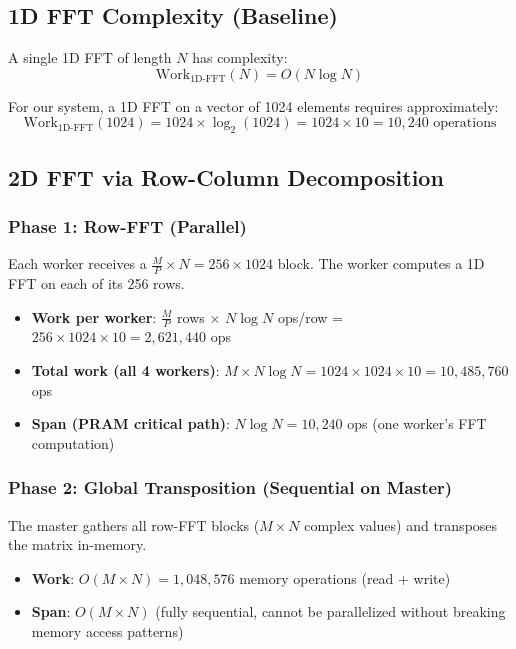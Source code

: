 \documentclass[11pt,a4paper]{article}
\begin{document}
\subsection{1D FFT Complexity (Baseline)}

A single 1D FFT of length $N$ has complexity:
\[
\text{Work}_{\text{1D-FFT}}(N) = O(N \log N)
\]

For our system, a 1D FFT on a vector of 1024 elements requires approximately:
\[
\text{Work}_{\text{1D-FFT}}(1024) = 1024 \times \log_2(1024) = 1024 \times 10 = 10{,}240 \text{ operations}
\]

\subsection{2D FFT via Row-Column Decomposition}

\subsubsection{Phase 1: Row-FFT (Parallel)}

Each worker receives a $\frac{M}{P} \times N = 256 \times 1024$ block. The worker computes a 1D FFT on each of its 256 rows.

\begin{itemize}
    \item \textbf{Work per worker}: $\frac{M}{P}$ rows $\times$ $N \log N$ ops/row = $256 \times 1024 \times 10 = 2{,}621{,}440$ ops
    \item \textbf{Total work (all 4 workers)}: $M \times N \log N = 1024 \times 1024 \times 10 = 10{,}485{,}760$ ops
    \item \textbf{Span (PRAM critical path)}: $N \log N = 10{,}240$ ops (one worker's FFT computation)
\end{itemize}

\subsubsection{Phase 2: Global Transposition (Sequential on Master)}

The master gathers all row-FFT blocks ($M \times N$ complex values) and transposes the matrix in-memory.

\begin{itemize}
    \item \textbf{Work}: $O(M \times N) = 1{,}048{,}576$ memory operations (read + write)
    \item \textbf{Span}: $O(M \times N)$ (fully sequential, cannot be parallelized without breaking memory access patterns)
\end{itemize}
\end{document}
